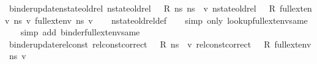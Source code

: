 \begin{isabellebody}
\ binder{\isacharunderscore}{\kern0pt}update{\isacharunderscore}{\kern0pt}nstate{\isacharunderscore}{\kern0pt}old{\isacharunderscore}{\kern0pt}rel{\isacharcolon}{\kern0pt}\ {\isachardoublequoteopen}nstate{\isacharunderscore}{\kern0pt}old{\isacharunderscore}{\kern0pt}rel\ {\isasymLambda}\ {\isasymLambda}{\isacharprime}{\kern0pt}\ R\ ns{}\ ns{}\ {\isasymLongrightarrow}\ {\isacharparenleft}{\kern0pt}{\isasymAnd}v{\isachardot}{\kern0pt}\ nstate{\isacharunderscore}{\kern0pt}old{\isacharunderscore}{\kern0pt}rel\ {\isasymLambda}\ {\isasymLambda}{\isacharprime}{\kern0pt}\ R\ {\isacharparenleft}{\kern0pt}full{\isacharunderscore}{\kern0pt}ext{\isacharunderscore}{\kern0pt}env\ ns{}\ v{\isacharparenright}{\kern0pt}\ {\isacharparenleft}{\kern0pt}full{\isacharunderscore}{\kern0pt}ext{\isacharunderscore}{\kern0pt}env\ ns{}\ v{\isacharparenright}{\kern0pt}{\isacharparenright}{\kern0pt}{\isachardoublequoteclose}\isanewline
%
\isadelimproof
\ \ %
\endisadelimproof
%
\isatagproof
{}\isamarkupfalse%
\ nstate{\isacharunderscore}{\kern0pt}old{\isacharunderscore}{\kern0pt}rel{\isacharunderscore}{\kern0pt}def\isanewline
\ \ \isamarkupfalse%
\ {\isacharparenleft}{\kern0pt}simp\ only{\isacharcolon}{\kern0pt}\ lookup{\isacharunderscore}{\kern0pt}full{\isacharunderscore}{\kern0pt}ext{\isacharunderscore}{\kern0pt}env{\isacharunderscore}{\kern0pt}same{\isacharparenright}{\kern0pt}\isanewline
\ \ \isamarkupfalse%
\ {\isacharparenleft}{\kern0pt}simp\ add{\isacharcolon}{\kern0pt}\ binder{\isacharunderscore}{\kern0pt}full{\isacharunderscore}{\kern0pt}ext{\isacharunderscore}{\kern0pt}env{\isacharunderscore}{\kern0pt}same{\isacharparenright}{\kern0pt}%
\endisatagproof
{\isafoldproof}%
%
\isadelimproof
\isanewline
%
\endisadelimproof
\isanewline
{}\isamarkupfalse%
\ binder{\isacharunderscore}{\kern0pt}update{\isacharunderscore}{\kern0pt}rel{\isacharunderscore}{\kern0pt}const{\isacharcolon}{\kern0pt}\ {\isachardoublequoteopen}rel{\isacharunderscore}{\kern0pt}const{\isacharunderscore}{\kern0pt}correct\ {\isasymLambda}\ {\isasymOmega}\ R\ ns\ {\isasymLongrightarrow}\ {\isacharparenleft}{\kern0pt}{\isasymAnd}v{\isachardot}{\kern0pt}\ rel{\isacharunderscore}{\kern0pt}const{\isacharunderscore}{\kern0pt}correct\ {\isasymLambda}\ {\isasymOmega}\ R\ {\isacharparenleft}{\kern0pt}full{\isacharunderscore}{\kern0pt}ext{\isacharunderscore}{\kern0pt}env\ ns\ v{\isacharparenright}{\kern0pt}{\isacharparenright}{\kern0pt}{\isachardoublequoteclose}\isanewline
%
\isadelimproof
\ \ %

\end{isabellebody}
